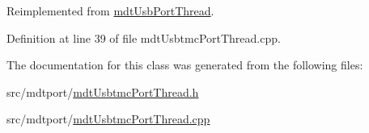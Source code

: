 Reimplemented from \hyperlink{classmdt_usb_port_thread_a74258f300967b5dea1fbfa9a0ccab38a}{mdt\-Usb\-Port\-Thread}.



Definition at line 39 of file mdt\-Usbtmc\-Port\-Thread.\-cpp.



The documentation for this class was generated from the following files\-:\begin{DoxyCompactItemize}
\item 
src/mdtport/\hyperlink{mdt_usbtmc_port_thread_8h}{mdt\-Usbtmc\-Port\-Thread.\-h}\item 
src/mdtport/\hyperlink{mdt_usbtmc_port_thread_8cpp}{mdt\-Usbtmc\-Port\-Thread.\-cpp}\end{DoxyCompactItemize}
